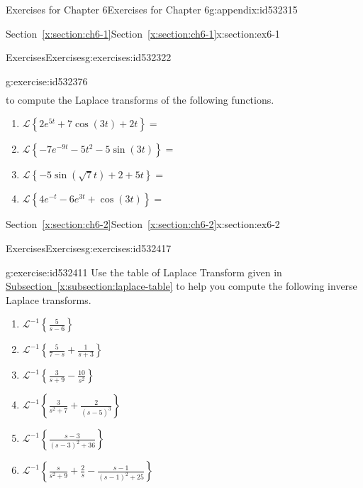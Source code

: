 \documentclass[oneside,10pt,]{book}
\newcommand{\xreffont}{\relax}
\numberwithin{equation}{section}
\numberwithin{equation}{section}
\begin{document}
\begin{appendixptx}{Exercises for Chapter 6}{}{Exercises for Chapter 6}{}{}{g:appendix:id532315}
\begin{sectionptx}{Section~{\xreffont\ref*{x:section:ch6-1}}}{}{Section~{\xreffont\ref*{x:section:ch6-1}}}{}{}{x:section:ex6-1}
\begin{exercises-subsection-numberless}{Exercises}{}{Exercises}{}{}{g:exercises:id532322}
\begin{divisionexercise}{4}{}{}{g:exercise:id532376}
\begin{align*}
\end{align*}
to compute the Laplace transforms of the following functions.%
%
\begin{enumerate}[label=(\alph*)]
\item{}\(\displaystyle \mathcal{L}\left\{ 2e^{5t}+7\cos(3t)+2t\right\} =\)%
\item{}\(\displaystyle \mathcal{L}\left\{ -7e^{-9t}-5t^{2}-5\sin(3t)\right\} =\)%
\item{}\(\displaystyle \mathcal{L}\left\{ -5\sin(\sqrt{7}t)+2+5t\right\} =\)%
\item{}\(\displaystyle \mathcal{L}\left\{ 4e^{-t}-6e^{3t}+\cos(3t)\right\} =\)%
\end{enumerate}
\end{divisionexercise}%
\end{exercises-subsection-numberless}
\end{sectionptx}
%
%
\typeout{************************************************}
\typeout{Section G.2 Section~{\xreffont\ref*{x:section:ch6-2}}}
\typeout{************************************************}
%
\begin{sectionptx}{Section~{\xreffont\ref*{x:section:ch6-2}}}{}{Section~{\xreffont\ref*{x:section:ch6-2}}}{}{}{x:section:ex6-2}
%
%
\typeout{************************************************}
\typeout{************************************************}
%
\begin{exercises-subsection-numberless}{Exercises}{}{Exercises}{}{}{g:exercises:id532417}
\begin{divisionexercise}{1}{}{}{g:exercise:id532411}%
Use the table of Laplace Transform given in \hyperref[x:subsection:laplace-table]{Subsection~{\xreffont\ref{x:subsection:laplace-table}}} to help you compute the following inverse Laplace transforms.%
%
\begin{enumerate}[label=(\alph*)]
\item{}\(\displaystyle \mathcal{L}^{-1}\left\{ \frac{5}{s-6}\right\}\)%
\item{}\(\displaystyle \mathcal{L}^{-1}\left\{ \frac{5}{7-s}+\frac{1}{s+3}\right\} \)%
\item{}\(\displaystyle \mathcal{L}^{-1}\left\{ \frac{3}{s+9}-\frac{10}{s^{2}}\right\} \)%
\item{}\(\displaystyle \mathcal{L}^{-1}\left\{ \frac{3}{s^{2}+7}+\frac{2}{\left(s-5\right)^{3}}\right\} \)%
\item{}\(\displaystyle \mathcal{L}^{-1}\left\{ \frac{s-3}{\left(s-3\right)^{2}+36}\right\} \)%
\item{}\(\displaystyle \mathcal{L}^{-1}\left\{ \frac{s}{s^{2}+9}+\frac{2}{s}-\frac{s-1}{\left(s-1\right)^{2}+25}\right\} \)%

\end{enumerate}
\end{divisionexercise}
\end{exercises-subsection-numberless}
\end{sectionptx}
\end{appendixptx}
\end{document}
